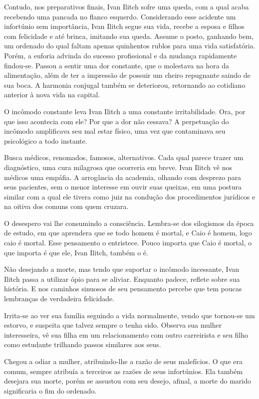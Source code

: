 \documentclass[12pt]{extarticle}
\begin{document}
Contudo, nos preparativos finais, Ivan Ilitch sofre uma queda, com a
qual acaba recebendo uma pancada no flanco esquerdo. Considerando esse
acidente um infortúnio sem importância, Ivan Ilitch segue sua vida,
recebe a esposa e filhos com felicidade e até brinca, imitando sua
queda. Assume o posto, ganhando bem, um ordenado do qual faltam apenas
quinhentos rublos para uma vida satisfatória. Porém, a euforia advinda
do sucesso profissional e da mudança rapidamente findou-se. Passou a
sentir uma dor constante, que o molestava na hora da alimentação, além
de ter a impressão de possuir um cheiro repugnante saindo de sua boca. A
harmonia conjugal também se deteriorou, retornando ao cotidiano anterior
à nova vida na capital.

O incômodo constante leva Ivan Ilitch a uma constante irritabilidade.
Ora, por que isso acontecia com ele? Por que a dor não cessava? A
perpetuação do incômodo amplificava seu mal estar físico, uma vez que
contaminava seu psicológico a todo instante.

Busca médicos, renomados, famosos, alternativos. Cada qual parece trazer
um diagnóstico, uma cura milagrosa que ocorreria em breve. Ivan Ilitch
vê nos médicos uma empáfia. A arrogância da academia, olhando com
desprezo para seus pacientes, sem o menor interesse em ouvir suas
queixas, em uma postura similar com a qual ele tivera como juiz na
condução dos procedimentos jurídicos e na oitiva dos comuns com quem
cruzara.

O desespero vai lhe consumindo a consciência. Lembra-se dos silogismos
da época de estudo, em que aprendera que se todo homem é mortal, e Caio
é homem, logo caio é mortal. Esse pensamento o entristece. Pouco importa
que Caio é mortal, o que importa é que ele, Ivan Ilitch, também o é.

Não desejando a morte, mas tendo que suportar o incômodo incessante,
Ivan Ilitch passa a utilizar ópio para se aliviar. Enquanto padece,
reflete sobre sua história. E nos caminhos sinuosos de seu pensamento
percebe que tem poucas lembranças de verdadeira felicidade.

Irrita-se ao ver sua família seguindo a vida normalmente, vendo que
tornou-se um estorvo, e suspeita que talvez sempre o tenha sido. Observa
sua mulher interesseira, vê sua filha em um relacionamento com outro
carreirista e seu filho como estudante trilhando passos similares aos
seus.

Chegou a odiar a mulher, atribuindo-lhe a razão de seus malefícios. O
que era comum, sempre atribuía a terceiros as razões de seus
infortúnios. Ela também desejara sua morte, porém se assustou com seu
desejo, afinal, a morte do marido significaria o fim do ordenado.
\end{document}
